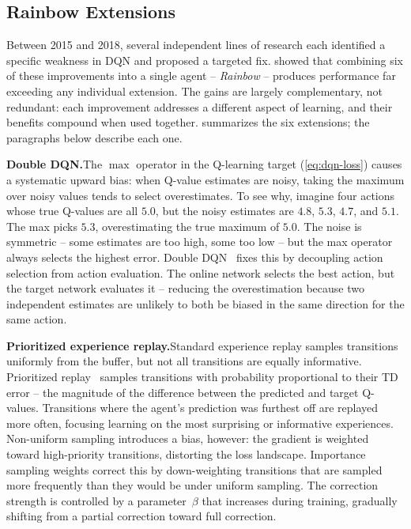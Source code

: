 \subsection{Rainbow Extensions}
\label{subsec:rainbow-extensions}

Between 2015 and 2018, several independent lines of research each
identified a specific weakness in DQN and proposed a targeted fix.
\citet{hessel2018rainbow} showed that combining six of these
improvements into a single agent -- \emph{Rainbow} -- produces
performance far exceeding any individual extension. The gains are
largely complementary, not redundant: each improvement addresses a
different aspect of learning, and their benefits compound when used
together.  summarizes the six
extensions; the paragraphs below describe each one.



\smallskip
\textbf{Double DQN.}\quad The $\max$ operator in the Q-learning
target (\cref{eq:dqn-loss}) causes a systematic upward bias: when
Q-value estimates are noisy, taking the maximum over noisy values
tends to select overestimates. To see why, imagine four actions
whose true Q-values are all $5.0$, but the noisy estimates are
$4.8$, $5.3$, $4.7$, and $5.1$. The max picks $5.3$,
overestimating the true maximum of $5.0$. The noise is symmetric --
some estimates are too high, some too low -- but the max operator
always selects the highest error. Double
DQN~\citep{van2016deep} fixes this by decoupling action
selection from action evaluation. The online network selects the
best action, but the target network evaluates it -- reducing the
overestimation because two independent estimates are unlikely to
both be biased in the same direction for the same action.

\smallskip
\textbf{Prioritized experience replay.}\quad Standard experience
replay samples transitions uniformly from the buffer, but not all
transitions are equally informative. Prioritized
replay~\citep{schaul2016prioritized} samples transitions with
probability proportional to their TD error -- the magnitude of the
difference between the predicted and target Q-values. Transitions
where the agent's prediction was furthest off are replayed more
often, focusing learning on the most surprising or informative
experiences. Non-uniform sampling introduces a bias, however: the
gradient is weighted toward high-priority transitions, distorting
the loss landscape. Importance sampling weights correct this by
down-weighting transitions that are sampled more frequently than
they would be under uniform sampling. The correction strength is
controlled by a parameter~$\beta$ that increases during training,
gradually shifting from a partial correction toward full correction.

